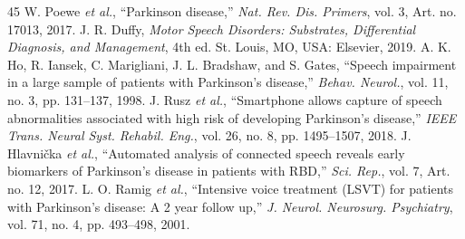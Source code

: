 \documentclass[journal,10pt,twoside]{IEEEtran}
\begin{document}
\begin{thebibliography}{45}
 W. Poewe \textit{et al.}, ``Parkinson disease,'' \textit{Nat. Rev. Dis. Primers}, vol. 3, Art. no. 17013, 2017.
 J. R. Duffy, \textit{Motor Speech Disorders: Substrates, Differential Diagnosis, and Management}, 4th ed. St. Louis, MO, USA: Elsevier, 2019.
 A. K. Ho, R. Iansek, C. Marigliani, J. L. Bradshaw, and S. Gates, ``Speech impairment in a large sample of patients with Parkinson's disease,'' \textit{Behav. Neurol.}, vol. 11, no. 3, pp. 131--137, 1998.
 J. Rusz \textit{et al.}, ``Smartphone allows capture of speech abnormalities associated with high risk of developing Parkinson's disease,'' \textit{IEEE Trans. Neural Syst. Rehabil. Eng.}, vol. 26, no. 8, pp. 1495--1507, 2018.
 J. Hlavni\v{c}ka \textit{et al.}, ``Automated analysis of connected speech reveals early biomarkers of Parkinson's disease in patients with RBD,'' \textit{Sci. Rep.}, vol. 7, Art. no. 12, 2017.
 L. O. Ramig \textit{et al.}, ``Intensive voice treatment (LSVT) for patients with Parkinson's disease: A 2 year follow up,'' \textit{J. Neurol. Neurosurg. Psychiatry}, vol. 71, no. 4, pp. 493--498, 2001.
\end{thebibliography}
\end{document}
